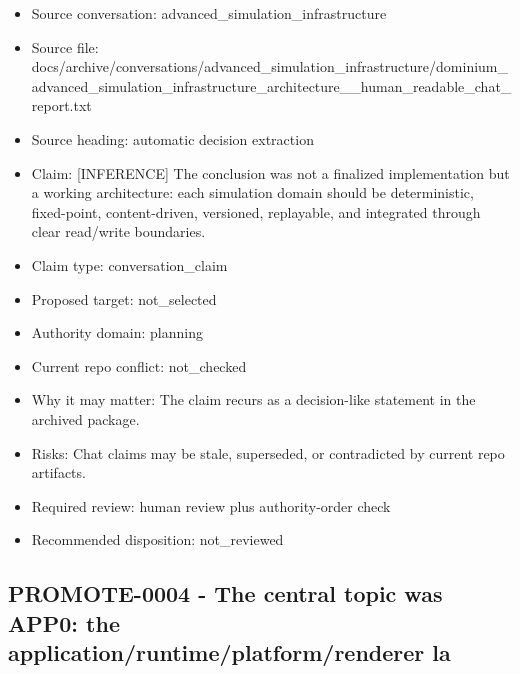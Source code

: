 \documentclass[11pt,a4paper]{report}
\begin{document}
\begin{itemize}
\item Source conversation: advanced\_simulation\_infrastructure
\item Source file: docs/archive/conversations/advanced\_simulation\_infrastructure/dominium\_advanced\_simulation\_infrastructure\_architecture\_\_human\_readable\_chat\_report.txt
\item Source heading: automatic decision extraction
\item Claim: [INFERENCE] The conclusion was not a finalized implementation but a working architecture: each simulation domain should be deterministic, fixed-point, content-driven, versioned, replayable, and integrated through clear read/write boundaries.
\item Claim type: conversation\_claim
\item Proposed target: not\_selected
\item Authority domain: planning
\item Current repo conflict: not\_checked
\item Why it may matter: The claim recurs as a decision-like statement in the archived package.
\item Risks: Chat claims may be stale, superseded, or contradicted by current repo artifacts.
\item Required review: human review plus authority-order check
\item Recommended disposition: not\_reviewed
\end{itemize}

\subsection{PROMOTE-0004 - The central topic was APP0: the application/runtime/platform/renderer la}
\end{document}
